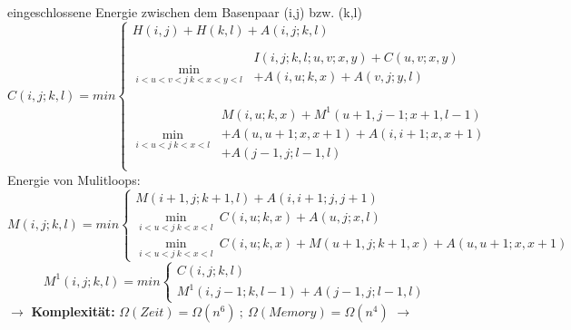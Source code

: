 eingeschlossene Energie zwischen dem Basenpaar (i,j) bzw. (k,l)
\begin{equation}
C(i,j;k,l)= min 
\begin{cases} 
H(i,j) + H(k,l) + A(i,j;k,l) \\ 
\\					
\displaystyle\min_{i < u < v < j \ k<x<y<l}\ 
\begin{split}
I(i,j;k,l;u,v;x,y) + C(u,v;x,y)  \\
+ A(i,u;k,x) + A(v,j;y,l)\\ 
\end{split}
\\
\\
\displaystyle\min_{i<u<j \ k<x<l}\ 
\begin{split}
M(i,u;k,x) + M^{1}(u+1,j-1;x+1,l-1) \\ 
+ A(u,u+1;x,x+1) + A(i,i+1;x,x+1) \\ 
+ A(j-1,j;l-1,l)\\ 
\end{split}
\end{cases}
\end{equation}
Energie von Mulitloops:
\begin{equation}
M(i,j;k,l) = min
\begin{cases}
M(i+1,j;k+1,l) + A(i,i+1;j,j+1) \\
\displaystyle\min_{i<u<j \ k<x<l}\ C(i,u;k,x) + A(u,j;x,l) \\
\displaystyle\min_{i<u<j \ k<x<l}\ C(i,u;k,x) + M(u+1,j;k+1,x) + A(u,u+1;x,x+1) 
\end{cases}
\end{equation}
\begin{equation}
M^1(i,j;k,l) = min
\begin{cases}
C(i,j;k,l) \\
M^1(i,j-1;k,l-1) + A(j-1,j;l-1,l)
\end{cases}
\end{equation}
$\rightarrow$ \textbf{Komplexität:} $\Omega(Zeit) = \Omega(n^6) \ ; \ \Omega(Memory) = \Omega(n^4)$ $\rightarrow$

